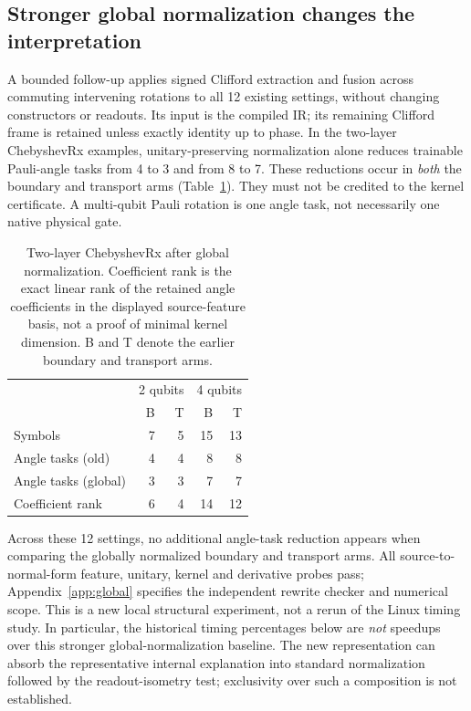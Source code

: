 \subsection{Stronger global normalization changes the interpretation}
\label{sec:globalresults}
A bounded follow-up applies signed Clifford extraction and fusion across
commuting intervening rotations to all 12 existing settings, without
changing constructors or readouts. Its input is the compiled IR; its
remaining Clifford frame is retained unless exactly identity up to
phase. In the two-layer ChebyshevRx examples, unitary-preserving
normalization alone reduces trainable Pauli-angle tasks from 4 to 3
and from 8 to 7. These reductions occur in \emph{both} the boundary and
transport arms (Table~\ref{tab:global}). They must not be credited to
the kernel certificate. A multi-qubit Pauli rotation is one angle task,
not necessarily one native physical gate.

\begin{table}[htbp]
\caption{Two-layer ChebyshevRx after global normalization.
Coefficient rank is the exact linear rank of the retained angle
coefficients in the displayed source-feature basis, not a proof of
minimal kernel dimension. B and T denote the earlier boundary and
transport arms.}
\label{tab:global}
\begin{tabular}{lrrrr}
& \multicolumn{2}{c}{2 qubits} & \multicolumn{2}{c}{4 qubits}\\
& B & T & B & T\\
\toprule
Symbols & 7 & 5 & 15 & 13\\
Angle tasks (old) & 4 & 4 & 8 & 8\\
Angle tasks (global) & 3 & 3 & 7 & 7\\
Coefficient rank & 6 & 4 & 14 & 12\\
\bottomrule
\end{tabular}
\end{table}

Across these 12 settings, no additional angle-task reduction appears
when comparing the globally normalized boundary and transport arms.
All source-to-normal-form feature, unitary, kernel and derivative
probes pass; Appendix~\ref{app:global} specifies the independent
rewrite checker and numerical scope. This is a new local structural
experiment, not a rerun of the Linux timing study. In particular,
the historical timing percentages below are \emph{not} speedups over
this stronger global-normalization baseline. The new representation
can absorb the representative internal explanation into standard
normalization followed by the readout-isometry test; exclusivity over
such a composition is not established.


